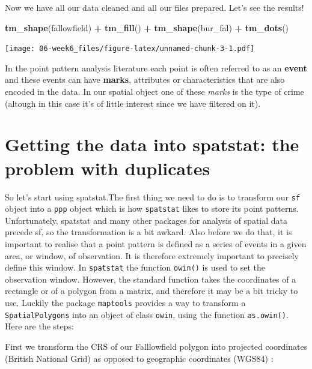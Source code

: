 \documentclass[]{book}
\newenvironment{Shaded}{\begin{snugshade}}{\end{snugshade}}
\newcommand{\KeywordTok}[1]{\textcolor[rgb]{0.13,0.29,0.53}{\textbf{#1}}}
\newcommand{\NormalTok}[1]{#1}
\newcommand{\OperatorTok}[1]{\textcolor[rgb]{0.81,0.36,0.00}{\textbf{#1}}}
\newcommand{\StringTok}[1]{\textcolor[rgb]{0.31,0.60,0.02}{#1}}
\begin{document}
Now we have all our data cleaned and all our files prepared. Let's see the results!

\begin{Shaded}
\begin{Highlighting}[]
\KeywordTok{tm_shape}\NormalTok{(fallowfield) }\OperatorTok{+}\StringTok{ }
\StringTok{  }\KeywordTok{tm_fill}\NormalTok{() }\OperatorTok{+}
\StringTok{  }\KeywordTok{tm_shape}\NormalTok{(bur_fal) }\OperatorTok{+}
\StringTok{  }\KeywordTok{tm_dots}\NormalTok{()}
\end{Highlighting}
\end{Shaded}

\texttt{[image: 06-week6\_files/figure-latex/unnamed-chunk-3-1.pdf]}

In the point pattern analysis literature each point is often referred to as an \textbf{event} and these events can have \textbf{marks}, attributes or characteristics that are also encoded in the data. In our spatial object one of these \emph{marks} is the type of crime (altough in this case it's of little interest since we have filtered on it).

\hypertarget{getting-the-data-into-spatstat-the-problem-with-duplicates}{%
\section{Getting the data into spatstat: the problem with duplicates}\label{getting-the-data-into-spatstat-the-problem-with-duplicates}}

So let's start using spatstat.The first thing we need to do is to transform our \texttt{sf} object into a \texttt{ppp} object which is how \texttt{spatstat} likes to store its point patterns. Unfortunately, spatstat and many other packages for analysis of spatial data precede sf, so the transformation is a bit awkard. Also before we do that, it is important to realise that a point pattern is defined as a series of events in a given area, or window, of observation. It is therefore extremely important to precisely define this window. In \texttt{spatstat} the function \texttt{owin()} is used to set the observation window. However, the standard function takes the coordinates of a rectangle or of a polygon from a matrix, and therefore it may be a bit tricky to use. Luckily the package \texttt{maptools} provides a way to transform a \texttt{SpatialPolygons} into an object of class \texttt{owin}, using the function \texttt{as.owin()}. Here are the steps:

First we transform the CRS of our Falllowfield polygon into projected coordinates (British National Grid) as opposed to geographic coordinates (WGS84) :
\end{document}
